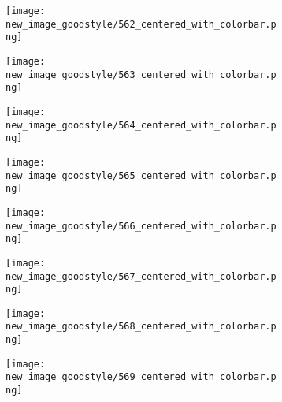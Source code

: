 \documentclass[a4paper,12pt]{article}
\begin{document}
\begin{figure}[H]
  \begin{subfigure}{0.11\textwidth}
    \texttt{[image: new\_image\_goodstyle/562\_centered\_with\_colorbar.png]}
  \end{subfigure}
  \hfill
  \begin{subfigure}{0.11\textwidth}
    \texttt{[image: new\_image\_goodstyle/563\_centered\_with\_colorbar.png]}
  \end{subfigure}
  \hfill
  \begin{subfigure}{0.11\textwidth}
    \texttt{[image: new\_image\_goodstyle/564\_centered\_with\_colorbar.png]}
  \end{subfigure}
  \hfill
  \begin{subfigure}{0.11\textwidth}
    \texttt{[image: new\_image\_goodstyle/565\_centered\_with\_colorbar.png]}
  \end{subfigure}
  \hfill
  \begin{subfigure}{0.11\textwidth}
    \texttt{[image: new\_image\_goodstyle/566\_centered\_with\_colorbar.png]}
  \end{subfigure}
  \hfill
  \begin{subfigure}{0.11\textwidth}
    \texttt{[image: new\_image\_goodstyle/567\_centered\_with\_colorbar.png]}
  \end{subfigure}
  \hfill
  \begin{subfigure}{0.11\textwidth}
    \texttt{[image: new\_image\_goodstyle/568\_centered\_with\_colorbar.png]}
  \end{subfigure}
  \hfill
  \begin{subfigure}{0.11\textwidth}
    \texttt{[image: new\_image\_goodstyle/569\_centered\_with\_colorbar.png]}
  \end{subfigure}
  \hfill
\end{figure}
\end{document}
